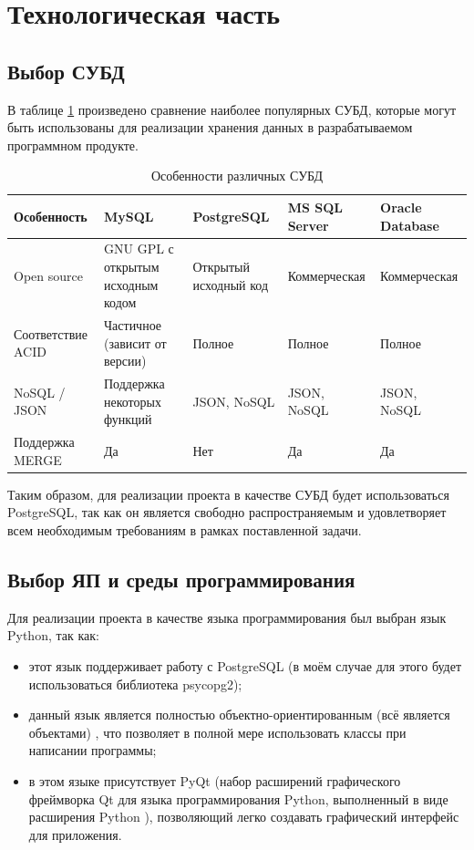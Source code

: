 \section{Технологическая часть}

\subsection{Выбор СУБД}

В таблице \ref{tab:subd} произведено сравнение наиболее популярных СУБД, которые могут быть использованы для реализации хранения данных в разрабатываемом программном продукте.

\begin{table}[!h]
	\captionsetup{justification=centering}
	\caption{\label{tab:subd} Особенности различных СУБД}
	\begin{center}
		\begin{tabular}{|p{}|p{}|p{}|p{}|p{}|}
			\hline
			\textbf{Особенность} & \textbf{MySQL} & \textbf{PostgreSQL} & \textbf{MS SQL Server} & \textbf{Oracle Database} \\
			\hline
			Open source & GNU GPL с открытым исходным кодом & Открытый исходный код & Коммерческая & Коммерческая\\
			\hline
			Соответствие ACID & Частичное (зависит от версии) \cite{acid} & Полное & Полное & Полное\\
			\hline
			NoSQL / JSON & Поддержка некоторых функций & JSON, NoSQL & JSON, NoSQL & JSON, NoSQL\\
			\hline
			Поддержка MERGE & Да & Нет & Да & Да\\
			\hline
		\end{tabular}
	\end{center}
\end{table}

Таким образом, для реализации проекта в качестве СУБД будет использоваться PostgreSQL, так как он является свободно распространяемым и удовлетворяет всем необходимым требованиям в рамках поставленной задачи.

\subsection{Выбор ЯП и среды программирования}

Для реализации проекта в качестве языка программирования был выбран язык Python, так как:
\begin{itemize}
	\item этот язык поддерживает работу с PostgreSQL (в моём случае для этого будет использоваться библиотека psycopg2);
	\item данный язык является полностью объектно-ориентированным (всё является объектами) \cite{python}, что позволяет в полной мере использовать классы при написании программы;
	\item в этом языке присутствует PyQt (набор расширений графического фреймворка Qt для языка программирования Python, выполненный в виде расширения Python \cite{pyqt}), позволяющий легко создавать графический интерфейс для приложения.
\end{itemize}

